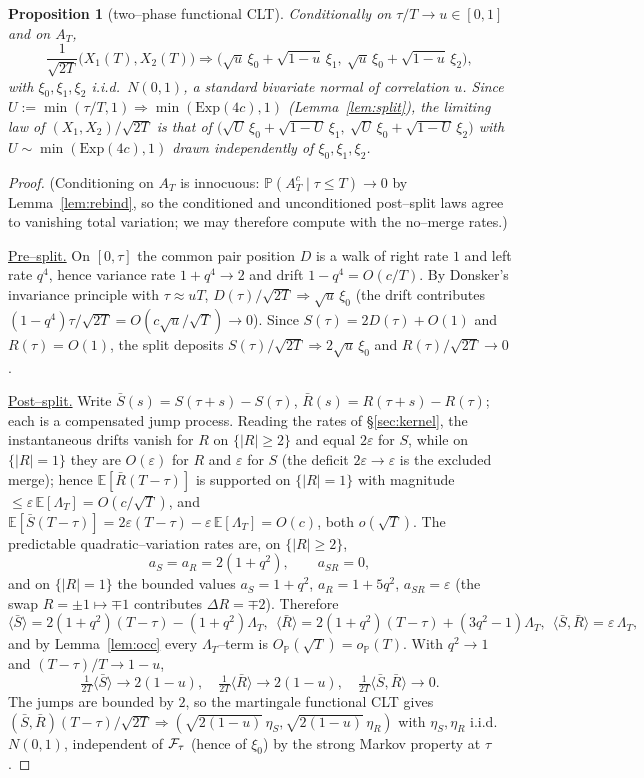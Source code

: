 \documentclass[11pt]{article}
\theoremstyle{plain}
\newtheorem{proposition}[theorem]{Proposition}
\theoremstyle{definition}
\theoremstyle{remark}
\newcommand{\E}{\mathbb{E}}\newcommand{\PP}{\mathbb{P}}\newcommand{\dd}{\,\mathrm{d}}
\newcommand{\To}{\Rightarrow}\newcommand{\so}{\mathfrak{so}}
\newcommand{\eps}{\varepsilon}\newcommand{\Exp}{\mathrm{Exp}}
\begin{document}
\begin{proposition}[two--phase functional CLT]\label{prop:twophase}
Conditionally on $\tau/T\to u\in[0,1]$ and on $A_T$,
\[
  \frac1{\sqrt{2T}}\big(X_1(T),X_2(T)\big)\To
  \big(\sqrt u\,\xi_0+\sqrt{1-u}\,\xi_1,\ \sqrt u\,\xi_0+\sqrt{1-u}\,\xi_2\big),
\]
with $\xi_0,\xi_1,\xi_2$ i.i.d.\ $N(0,1)$, a standard bivariate normal of correlation $u$.
Since $U:=\min(\tau/T,1)\To\min(\Exp(4c),1)$ (Lemma~\ref{lem:split}), the limiting law of
$(X_1,X_2)/\sqrt{2T}$ is that of
$\big(\sqrt U\,\xi_0+\sqrt{1-U}\,\xi_1,\ \sqrt U\,\xi_0+\sqrt{1-U}\,\xi_2\big)$ with
$U\sim\min(\Exp(4c),1)$ drawn independently of $\xi_0,\xi_1,\xi_2$.
\end{proposition}
\begin{proof}
(Conditioning on $A_T$ is innocuous: $\PP(A_T^c\mid\tau\le T)\to0$ by
Lemma~\ref{lem:rebind}, so the conditioned and unconditioned post--split laws agree
to vanishing total variation; we may therefore compute with the no--merge rates.)

\underline{Pre--split.} On $[0,\tau]$ the common pair position $D$ is a walk of right rate
$1$ and left rate $q^4$, hence variance rate $1+q^4\to2$ and drift $1-q^4=O(c/T)$. By
Donsker's invariance principle with $\tau\approx uT$, $D(\tau)/\sqrt{2T}\To\sqrt u\,\xi_0$
(the drift contributes $(1-q^4)\tau/\sqrt{2T}=O(c\sqrt u/\sqrt T)\to0$). Since
$S(\tau)=2D(\tau)+O(1)$ and $R(\tau)=O(1)$, the split deposits
$S(\tau)/\sqrt{2T}\To2\sqrt u\,\xi_0$ and $R(\tau)/\sqrt{2T}\to0$.

\underline{Post--split.} Write $\bar S(s)=S(\tau{+}s)-S(\tau)$, $\bar R(s)=R(\tau{+}s)-R(\tau)$;
each is a compensated jump process. Reading the rates of \S\ref{sec:kernel}, the
instantaneous drifts vanish for $R$ on $\{|R|\ge2\}$ and equal $2\eps$ for $S$, while on
$\{|R|=1\}$ they are $O(\eps)$ for $R$ and $\eps$ for $S$ (the deficit $2\eps\to\eps$ is
the excluded merge); hence $\E[\bar R(T{-}\tau)]$ is supported on $\{|R|=1\}$ with
magnitude $\le\eps\,\E[\Lambda_T]=O(c/\sqrt T)$, and
$\E[\bar S(T{-}\tau)]=2\eps(T{-}\tau)-\eps\,\E[\Lambda_T]=O(c)$, both $o(\sqrt T)$. The
predictable quadratic--variation rates are, on $\{|R|\ge2\}$,
\[
  a_S=a_R=2(1+q^2),\qquad a_{SR}=0,
\]
and on $\{|R|=1\}$ the bounded values $a_S=1+q^2$, $a_R=1+5q^2$, $a_{SR}=\eps$ (the swap
$R=\pm1\mapsto\mp1$ contributes $\Delta R=\mp2$). Therefore
\[
  \langle\bar S\rangle=2(1+q^2)(T{-}\tau)-(1+q^2)\Lambda_T,\ \
  \langle\bar R\rangle=2(1+q^2)(T{-}\tau)+(3q^2{-}1)\Lambda_T,\ \
  \langle\bar S,\bar R\rangle=\eps\,\Lambda_T,
\]
and by Lemma~\ref{lem:occ} every $\Lambda_T$--term is $O_\PP(\sqrt T)=o_\PP(T)$. With
$q^2\to1$ and $(T{-}\tau)/T\to1-u$,
\[
  \tfrac1{2T}\langle\bar S\rangle\to2(1-u),\quad
  \tfrac1{2T}\langle\bar R\rangle\to2(1-u),\quad
  \tfrac1{2T}\langle\bar S,\bar R\rangle\to0.
\]
The jumps are bounded by $2$, so the martingale functional CLT
\cite[Thm.~7.1.4]{EK} gives $(\bar S,\bar R)(T{-}\tau)/\sqrt{2T}\To
(\sqrt{2(1-u)}\,\eta_S,\sqrt{2(1-u)}\,\eta_R)$ with $\eta_S,\eta_R$ i.i.d.\ $N(0,1)$,
independent of $\mathcal F_\tau$ (hence of $\xi_0$) by the strong Markov property at $\tau$.


\end{proof}
\end{document}
